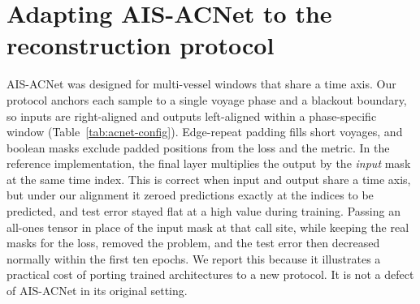 \section{Adapting AIS-ACNet to the reconstruction protocol}
\label{app:acnet}

AIS-ACNet was designed for multi-vessel windows that share a time axis. Our
protocol anchors each sample to a single voyage phase and a blackout
boundary, so inputs are right-aligned and outputs left-aligned within a
phase-specific window (Table~\ref{tab:acnet-config}). Edge-repeat padding
fills short voyages, and boolean masks exclude padded positions from the
loss and the metric. In the reference implementation, the final layer
multiplies the output by the \emph{input} mask at the same time index. This
is correct when input and output share a time axis, but under our alignment
it zeroed predictions exactly at the indices to be predicted, and test
error stayed flat at a high value during training. Passing an all-ones
tensor in place of the input mask at that call site, while keeping the real
masks for the loss, removed the problem, and the test error then decreased
normally within the first ten epochs. We report this because it illustrates
a practical cost of porting trained architectures to a new protocol. It is
not a defect of AIS-ACNet in its original setting.
